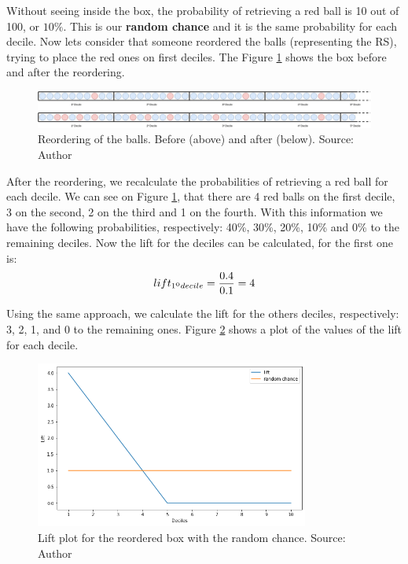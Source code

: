 Without seeing inside the box, the probability of retrieving a red ball is 10 out of 100, or \textbf{$10\%$}. This is our \textbf{random chance} and it is the same probability for each decile. Now lets consider that someone reordered the balls (representing the RS), trying to place the red ones on first deciles. The Figure \ref{fig:rec-box-ordering} shows the box before and after the reordering.

\begin{figure}[h]
   \centering
   \includegraphics[width=\linewidth]{fig/ch2-rec-box-ordering.jpg}
   \caption{Reordering of the balls. Before (above) and after (below). Source: Author}
   \label{fig:rec-box-ordering}
\end{figure}

After the reordering, we recalculate the probabilities of retrieving a red ball for each decile. We can see on Figure \ref{fig:rec-box-ordering}, that there are 4 red balls on the first decile, 3 on the second, 2 on the third and 1 on the fourth. With this information we have the following probabilities, respectively: 40\%, 30\%, 20\%, 10\% and 0\% to the remaining deciles. Now the lift for the deciles can be calculated, for the first one is:
\begin{equation}
	lift_{1\textsuperscript{o} decile} = \frac{0.4}{0.1} = 4
\end{equation}

Using the same approach, we calculate the lift for the others deciles, respectively: 3, 2, 1, and 0 to the remaining ones. Figure \ref{fig:lift-plot} shows a plot of the values of the lift for each decile.

\begin{figure}[h]
   \centering
   \includegraphics[width=9cm]{fig/ch2-lift-plot.png}
   \caption{Lift plot for the reordered box with the random chance. Source: Author}
   \label{fig:lift-plot}
\end{figure}

